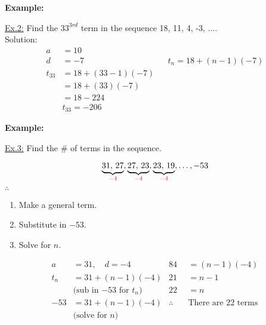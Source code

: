 \documentclass[12pt,a4paper]{article}
\newenvironment{example}
  {\begin{framed}\colorbox{examplecolor}{
  \parbox{\dimexpr\linewidth-2\fboxsep}{
  \textbf{Example:}}}}
  {\end{framed}}
\begin{document}
\begin{example}
    \underline{Ex.2:} Find the $33^{3rd}$ term in the sequence 18, 11, 4, -3, $\ldots$. \\ 
    Solution:
    \begin{align*}
        a &=10 \\
        d&= -7 && t_n=18+(n-1)(-7) \\ 
        t_{33}&=18+(33-1)(-7)\\
        &=18+(33)(-7)\\
        &=18-224\\
        & \boxed{t_{33}=-206}
    \end{align*}
\end{example}
\begin{example}
    \underline{Ex.3:} Find the \# of terms in the sequence.

\begin{center}
    \begin{minipage}{0.4\textwidth}
\begin{equation*}
    \underbrace{\text{31, 27}}_{\textcolor{red}{-4}}, \underbrace{\text{27, 23}}_{\textcolor{red}{-4}}, \underbrace{\text{23, 19}}_{\textcolor{red}{-4}}, \ldots, -53
\end{equation*}
        \vspace{1ex} 
        $\therefore$ \textcolor{red}{}
    \end{minipage}%
    \begin{minipage}{0.6\textwidth}
        \begin{enumerate}
            \item Make a general term.
            \item Substitute in $-53$.
            \item Solve for $n$.
        \end{enumerate}
    \end{minipage}
\end{center}
\begin{align*}
    a &= 31, \quad d= -4 & 84 &= (n-1)(-4)\\
    t_n &= 31 + (n-1)(-4) & 21 &= n-1\\
    &\text{(sub in $-53$ for $t_n$)} \quad & 22 &= n \\
    -53 &= 31 + (n-1)(-4) & \therefore \quad & \text{There are 22 terms}\\
    &\text{(solve for $n$)}
\end{align*}
\end{example}
\newpage 
\end{document}
